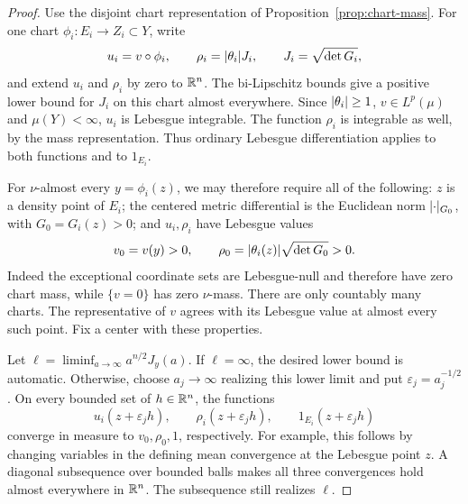 \begin{proof}
Use the disjoint chart representation of
Proposition~\ref{prop:chart-mass}. For one chart
$\phi_i:E_i\to Z_i\subset Y$, write
\[
 u_i=v\circ\phi_i,
 \qquad \rho_i=\lvert\theta_i\rvert J_i,
 \qquad J_i=\sqrt{\det G_i},
\]
and extend $u_i$ and $\rho_i$ by zero to $\mathbb R^n$. The
bi-Lipschitz bounds give a positive lower bound for $J_i$ on
this chart almost everywhere. Since $\lvert\theta_i\rvert\ge1$,
$v\in L^p(\mu)$ and $\mu(Y)<\infty$, $u_i$ is Lebesgue
integrable. The function $\rho_i$ is integrable as well, by
the mass representation. Thus ordinary Lebesgue differentiation
applies to both functions and to $1_{E_i}$.

For $\nu$-almost every $y=\phi_i(z)$, we may therefore require
all of the following: $z$ is a density point of $E_i$; the centered
metric differential is the Euclidean norm $\lvert\cdot\rvert_{G_0}$,
with $G_0=G_i(z)>0$; and $u_i,\rho_i$ have Lebesgue values
\begin{equation}\label{chord:lebesgue-values}
 v_0=v(y)>0,
 \qquad \rho_0=\lvert\theta_i(z)\rvert\sqrt{\det G_0}>0.
\end{equation}
Indeed the exceptional coordinate sets are Lebesgue-null and
therefore have zero chart mass, while $\{v=0\}$ has zero
$\nu$-mass. There are only countably many charts. The representative
of $v$ agrees with its Lebesgue value at almost every such point.
Fix a center with these properties.

Let $\ell=\liminf_{a\to\infty}a^{n/2}J_y(a)$. If
$\ell=\infty$, the desired lower bound is automatic. Otherwise,
choose $a_j\to\infty$ realizing this lower limit and put
$\varepsilon_j=a_j^{-1/2}$. On every bounded set of
$h\in\mathbb R^n$, the functions
\[
 u_i(z+\varepsilon_jh),\qquad
 \rho_i(z+\varepsilon_jh),\qquad
 1_{E_i}(z+\varepsilon_jh)
\]
converge in measure to $v_0,\rho_0,1$, respectively. For example,
this follows by changing variables in the defining mean convergence
at the Lebesgue point $z$. A diagonal subsequence over bounded
balls makes all three convergences hold almost everywhere in
$\mathbb R^n$. The subsequence still realizes $\ell$.


\end{proof}
